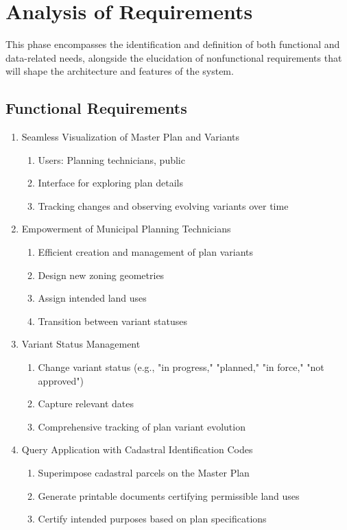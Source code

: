 
\chapter{Analysis of Requirements}
\label{chp:Analysis of Requirements}


This phase encompasses the identification and definition of both functional and data-related needs, alongside the elucidation of nonfunctional requirements that will shape the architecture and features of the system.

\section{Functional Requirements}
\begin{enumerate}
  \item Seamless Visualization of Master Plan and Variants
  \begin{enumerate}
      \item Users: Planning technicians, public
      \item Interface for exploring plan details
      \item Tracking changes and observing evolving variants over time
  \end{enumerate}
  \item Empowerment of Municipal Planning Technicians
  \begin{enumerate}
      \item Efficient creation and management of plan variants
      \item Design new zoning geometries
      \item Assign intended land uses
      \item Transition between variant statuses
  \end{enumerate}
  \item Variant Status Management
  \begin{enumerate}
      \item Change variant status (e.g., "in progress," "planned," "in force," "not approved")
      \item Capture relevant dates
      \item Comprehensive tracking of plan variant evolution
  \end{enumerate}
  \item Query Application with Cadastral Identification Codes
  \begin{enumerate}
      \item Superimpose cadastral parcels on the Master Plan
      \item Generate printable documents certifying permissible land uses
      \item Certify intended purposes based on plan specifications
  \end{enumerate}
\end{enumerate}

